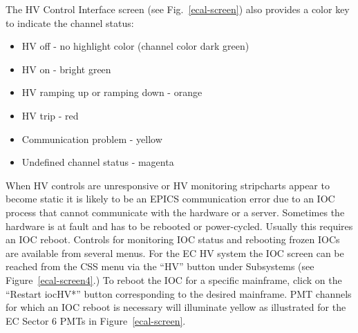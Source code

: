 \documentclass[letterpaper,10pt]{article}
\begin{document}
The HV Control Interface screen (see Fig.~\ref{ecal-screen}) also provides a color key to indicate 
the channel status:

\begin{itemize}
\item HV off - no highlight color (channel color dark green)
\item HV on - bright green
\item HV ramping up or ramping down - orange
\item HV trip - red
\item Communication problem - yellow
\item Undefined channel status - magenta
\end{itemize}

When HV controls are unresponsive or HV monitoring stripcharts appear to become static it is likely
to be an EPICS communication error due to an IOC process that cannot communicate with the hardware or a
server.  Sometimes the hardware is at fault and has to be rebooted or power-cycled.  Usually this
requires an IOC reboot.  Controls for monitoring IOC status and rebooting frozen IOCs are available from
several menus.  For the EC HV system the IOC screen can be reached from the CSS menu via the ``HV''
button under Subsystems (see Figure~\ref{ecal-screen4}.)  To reboot the
IOC for a specific mainframe, click on the ``Restart iocHV*'' button corresponding to the desired mainframe.
PMT channels for which an IOC reboot is necessary will illuminate yellow as illustrated for the EC Sector 6 PMTs
in Figure~\ref{ecal-screen}.
\end{document}
